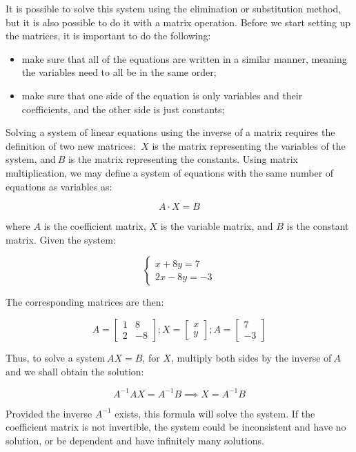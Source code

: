 \documentclass[11pt]{article}
\providecommand{\tightlist}{%
      \setlength{\itemsep}{0pt}\setlength{\parskip}{0pt}}
\begin{document}
It is possible to solve this system using the elimination or
substitution method, but it is also possible to do it with a matrix
operation. Before we start setting up the matrices, it is important to
do the following:

\begin{itemize}
\tightlist
\item
  make sure that all of the equations are written in a similar manner,
  meaning the variables need to all be in the same order;
\item
  make sure that one side of the equation is only variables and their
  coefficients, and the other side is just constants;
\end{itemize}

Solving a system of linear equations using the inverse of a matrix
requires the definition of two new matrices:  \(X\) is the matrix
representing the variables of the system, and \(B\) is the matrix
representing the constants. Using matrix multiplication, we may define a
system of equations with the same number of equations as variables as:

\[ A\cdot X = B\]

where \(A\) is the coefficient matrix, \(X\) is the variable matrix, and
\(B\) is the constant matrix. Given the system:

\[
\begin{cases}
x + 8y = 7 \\
2x − 8y = −3
\end{cases}
\]

The corresponding matrices are then:

\[
A=
\begin{bmatrix}
1 & 8\\
2 & −8
\end{bmatrix}
;
X=
\begin{bmatrix}
x\\
y
\end{bmatrix}
;
A=
\begin{bmatrix}
7\\
-3
\end{bmatrix}
\]

Thus, to solve a system \(AX=B\), for \(X\), multiply both sides by the
inverse of \(A\) and we shall obtain the solution:

\[A^{-1}AX=A^{-1}B \implies X = A^{-1}B \]

Provided the inverse \(A^{-1}\) exists, this formula will solve the
system. If the coefficient matrix is not invertible, the system could be
inconsistent and have no solution, or be dependent and have infinitely
many solutions.
\end{document}
